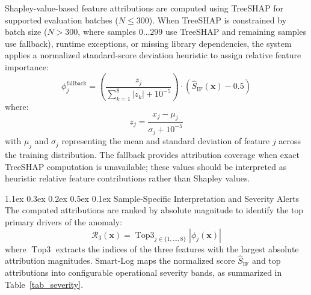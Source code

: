 \documentclass[10pt,conference]{IEEEtran}
\makeatletter
\renewcommand\subsection{\@startsection{subsection}{2}{\z@}%
  {1.1ex \@plus 0.3ex \@minus 0.2ex}%
  {0.5ex \@plus 0.1ex}%
  {\normalfont\fontsize{12pt}{14.4pt}\selectfont\bfseries}}
\makeatother
\begin{document}
Shapley-value-based feature attributions are computed using TreeSHAP for supported evaluation batches ($N \le 300$). When TreeSHAP is constrained by batch size ($N > 300$, where samples $0 \dots 299$ use TreeSHAP and remaining samples use fallback), runtime exceptions, or missing library dependencies, the system applies a normalized standard-score deviation heuristic to assign relative feature importance:
\begin{equation}
\phi_j^{\text{fallback}} = \left(\frac{z_j}{\sum_{k=1}^8 |z_k| + 10^{-5}}\right) \cdot \left(\hat{S}_{\text{IF}}(\mathbf{x}) - 0.5\right)
\end{equation}
where:
\begin{equation}
z_j = \frac{x_j - \mu_j}{\sigma_j + 10^{-5}}
\end{equation}
with $\mu_j$ and $\sigma_j$ representing the mean and standard deviation of feature $j$ across the training distribution. The fallback provides attribution coverage when exact TreeSHAP computation is unavailable; these values should be interpreted as heuristic relative feature contributions rather than Shapley values.

\subsection{Sample-Specific Interpretation and Severity Alerts}
The computed attributions are ranked by absolute magnitude to identify the top primary drivers of the anomaly:
\begin{equation}
\mathcal{R}_3(\mathbf{x}) = \operatorname{Top3}_{j \in \{1,\dots,8\}} |\phi_j(\mathbf{x})|
\end{equation}
where $\operatorname{Top3}$ extracts the indices of the three features with the largest absolute attribution magnitudes. Smart-Log maps the normalized score $\hat{S}_{\text{IF}}$ and top attributions into configurable operational severity bands, as summarized in Table~\ref{tab_severity}.

\begin{table}[t]
\caption{Operational Severity Bands and Triage Guidance}
\label{tab_severity}
\centering
{}
\end{table}
\end{document}
